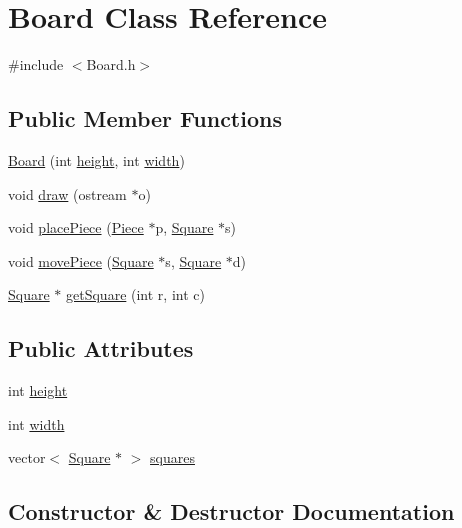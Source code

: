 \hypertarget{classBoard}{}\section{Board Class Reference}
\label{classBoard}


{\ttfamily \#include $<$Board.\+h$>$}

\subsection*{Public Member Functions}
\begin{DoxyCompactItemize}
\item 
\hyperlink{classBoard_a1291ca893864123e2a144ce5e4d8beb3}{Board} (int \hyperlink{classBoard_aa0cb8de0254520dc08dab5796643c8e5}{height}, int \hyperlink{classBoard_a90a8efaa4736af25511ac948bdd27d6c}{width})
\item 
void \hyperlink{classBoard_a07010bc149d198961c4669cec2ca4905}{draw} (ostream $\ast$o)
\item 
void \hyperlink{classBoard_ab96f988bdac00e84aa3ae9995e16921c}{place\+Piece} (\hyperlink{classPiece}{Piece} $\ast$p, \hyperlink{classSquare}{Square} $\ast$s)
\item 
void \hyperlink{classBoard_a71bbcd990439137e81b14ab229787daa}{move\+Piece} (\hyperlink{classSquare}{Square} $\ast$s, \hyperlink{classSquare}{Square} $\ast$d)
\item 
\hyperlink{classSquare}{Square} $\ast$ \hyperlink{classBoard_afa30630891e15327329bd1fb62de3484}{get\+Square} (int r, int c)
\end{DoxyCompactItemize}
\subsection*{Public Attributes}
\begin{DoxyCompactItemize}
\item 
int \hyperlink{classBoard_aa0cb8de0254520dc08dab5796643c8e5}{height}
\item 
int \hyperlink{classBoard_a90a8efaa4736af25511ac948bdd27d6c}{width}
\item 
vector$<$ \hyperlink{classSquare}{Square} $\ast$ $>$ \hyperlink{classBoard_a7a0a34a623e8fd5e350fdb31bd10f182}{squares}
\end{DoxyCompactItemize}


\subsection{Constructor \& Destructor Documentation}
\hypertarget{classBoard_a1291ca893864123e2a144ce5e4d8beb3}{}
